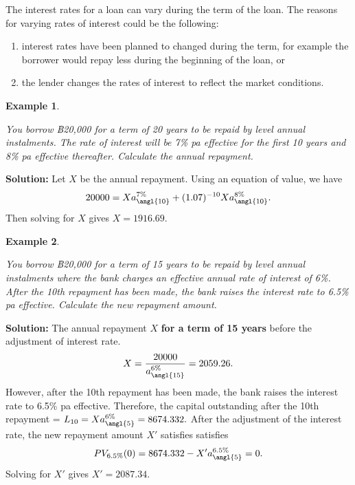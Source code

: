 \documentclass[landscape, 20pt]{extreport}
\theoremstyle{definition}
\theoremstyle{definition}
\newtheorem{example}{Example}[chapter]
\theoremstyle{definition}
\theoremstyle{definition}
\theoremstyle{remark}
\begin{document}
The interest rates for a loan can vary during the term of the loan. The
reasons for varying rates of interest could be the following:

\begin{enumerate}
\def\labelenumi{\arabic{enumi}.}
\item
  interest rates have been planned to changed during the term, for
  example the borrower would repay less during the beginning of the
  loan, or
\item
  the lender changes the rates of interest to reflect the market
  conditions.
\end{enumerate}

\newpage \begin{example}
\protect\hypertarget{exm:unlabeled-div-44}{}\label{exm:unlabeled-div-44}

\emph{You borrow ฿20,000 for a term of 20 years to be
repaid by level annual instalments. The rate of interest will be 7\% pa
effective for the first 10 years and 8\% pa effective thereafter.
Calculate the annual repayment.}

\end{example}

\textbf{Solution:} Let \(X\) be the annual repayment. Using an equation of
value, we have
\[20000 = X a^{7\%}_{\angl{10}} + (1.07)^{-10} X a^{8\%}_{\angl{10}}.\]
Then solving for \(X\) gives \(X = 1916.69\).

\newpage \begin{example}
\protect\hypertarget{exm:unlabeled-div-45}{}\label{exm:unlabeled-div-45}

\emph{You borrow ฿20,000 for a term of 15 years to be
repaid by level annual instalments where the bank charges an effective
annual rate of interest of 6\%. After the 10th repayment has been made,
the bank raises the interest rate to 6.5\% pa effective. Calculate the
new repayment amount.}

\end{example}

\textbf{Solution:} The annual repayment \(X\) \textbf{for a term of 15 years} before
the adjustment of interest rate.
\[X = \frac{20000}{a^{6\%}_{\angl{15}}} = 2059.26.\] However, after the
10th repayment has been made, the bank raises the interest rate to 6.5\%
pa effective. Therefore, the capital outstanding after the 10th
repayment = \(L_{10} = X a^{6\%}_{\angl{5}} = 8674.332.\) After the
adjustment of the interest rate, the new repayment amount \(X'\) satisfies
satisfies \[PV_{6.5\%}(0) = 8674.332 - X' a^{6.5\%}_{\angl{5}} = 0.\]
Solving for \(X'\) gives \(X' = 2087.34\).
\end{document}
